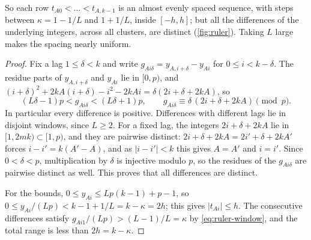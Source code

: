 \documentclass[11pt]{amsart}
\numberwithin{equation}{section}
\theoremstyle{definition}
\theoremstyle{remark}
\begin{document}
So each row $t_{A0}<\dots<t_{A,k-1}$ is an almost evenly spaced sequence,
with steps between $\kappa=1-1/L$ and $1+1/L$, inside $[-h,h]$; but all
the differences of the underlying integers, across all clusters, are
distinct (\cref{fig:ruler}). Taking $L$ large makes the spacing nearly
uniform.

\begin{proof}
Fix a lag $1\le\delta<k$ and write
$g_{Ai\delta}=y_{A,i+\delta}-y_{Ai}$ for $0\le i<k-\delta$. The residue
parts of $y_{A,i+\delta}$ and $y_{Ai}$ lie in $[0,p)$, and
$(i+\delta)^2+2kA(i+\delta)-i^2-2kAi=\delta(2i+\delta+2kA)$, so
\begin{equation}\label{eq:ruler-window}
 (L\delta-1)p<g_{Ai\delta}<(L\delta+1)p,
 \qquad
 g_{Ai\delta}\equiv\delta\,(2i+\delta+2kA)\pmod p.
\end{equation}
In particular every difference is positive. Differences with different
lags lie in disjoint windows, since $L\ge2$. For a fixed lag, the
integers $2i+\delta+2kA$ lie in $[1,2mk)\subset[1,p)$, and they are
pairwise distinct: $2i+\delta+2kA=2i'+\delta+2kA'$ forces
$i-i'=k(A'-A)$, and as $|i-i'|<k$ this gives $A=A'$ and $i=i'$. Since
$0<\delta<p$, multiplication by $\delta$ is injective modulo $p$, so the
residues of the $g_{Ai\delta}$ are pairwise distinct as well. This proves
that all differences are distinct.

For the bounds, $0\le y_{Ai}\le Lp(k-1)+p-1$, so
$0\le y_{Ai}/(Lp)<k-1+1/L=k-\kappa=2h$; this gives $|t_{Ai}|\le h$. The
consecutive differences satisfy $g_{Ai1}/(Lp)>(L-1)/L=\kappa$ by
\eqref{eq:ruler-window}, and the total range is less than $2h=k-\kappa$.
\end{proof}
\end{document}
